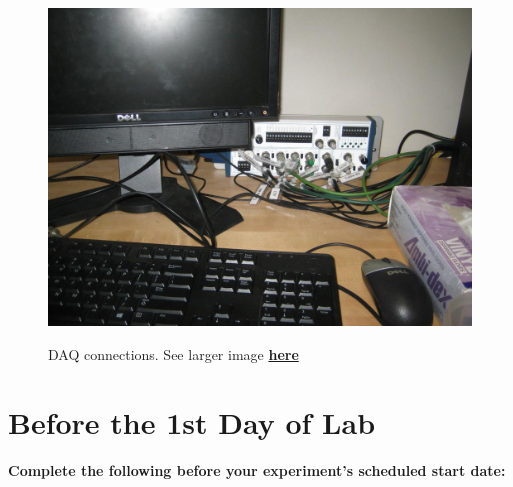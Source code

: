 \documentclass{../lab}
\begin{document}
\begin{figure}[h]
\begin{minipage}{0.32\textwidth}
\end{minipage}
\begin{minipage}{0.32\textwidth}
    \href{http://experimentationlab.berkeley.edu/sites/default/files/IMG\_4081.JPG}{\includegraphics[width=\linewidth,keepaspectratio]{images/IMG_4081.JPG}}
    \caption{DAQ connections. See larger image \href{http://experimentationlab.berkeley.edu/sites/default/files/IMG\_4081.JPG}{\textbf{here}}}
\end{minipage}
\end{figure}

\section{Before the 1st Day of Lab}
\label{sec:BeforeFirstDay}

\textbf{Complete the following before your experiment's scheduled start date:}
\end{document}

